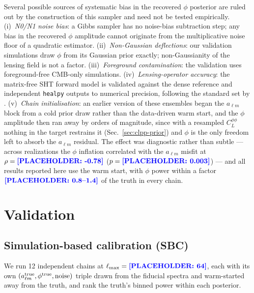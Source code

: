 \documentclass[twocolumn,superscriptaddress,aps,prl,floatfix]{revtex4-2}
\newcommand{\alm}{a_{\ell m}}
\newcommand{\clpp}{C_L^{\phi\phi}}
\newcommand{\lmax}{\ell_{\max}}
\newcommand{\placeholder}[1]{\textcolor{blue}{\textbf{[PLACEHOLDER: #1]}}}
\begin{document}
Several possible sources of systematic bias in the recovered $\phi$ posterior
are ruled out by the construction of this sampler and need not be tested
empirically.
(i)~\textit{N0/N1 noise bias}: a Gibbs sampler has no noise-bias subtraction
step; any bias in the recovered $\phi$ amplitude cannot originate from the
multiplicative noise floor of a quadratic estimator.
(ii)~\textit{Non-Gaussian deflections}: our validation simulations draw $\phi$
from its Gaussian prior exactly; non-Gaussianity of the lensing field is not a
factor.
(iii)~\textit{Foreground contamination}: the validation uses foreground-free
CMB-only simulations.
(iv)~\textit{Lensing-operator accuracy}: the matrix-free SHT forward model is
validated against the dense reference and independent \texttt{healpy} outputs to
numerical precision, following the standard set by \citet{Reinecke:2023}.
(v)~\textit{Chain initialisation}: an earlier version of these ensembles began
the $\alm$ block from a cold prior draw rather than the data-driven warm start,
and the $\phi$ amplitude then ran away by orders of magnitude, since with a
resampled $\clpp$ nothing in the target restrains it (Sec.~\ref{sec:clpp-prior})
and $\phi$ is the only freedom left to absorb the $\alm$ residual. The effect
was diagnostic rather than subtle --- across realizations the $\phi$ inflation
correlated with the $\alm$ misfit at $\rho = \placeholder{-0.78}$
($p = \placeholder{0.003}$) --- and all results reported here use the warm
start, with $\phi$ power within a factor $\placeholder{0.8\text{--}1.4}$ of the
truth in every chain.


\section{Validation}
\label{sec:results}

\subsection{Simulation-based calibration (SBC)}
\label{sec:sbc}

We run 12 independent chains at $\lmax = \placeholder{64}$, each with its own
$(\alm^{\rm true}, \phi^{\rm true}, \mathrm{noise})$ triple drawn from the
fiducial spectra and warm-started away from the truth, and rank the truth's
binned power within each posterior.
\end{document}
